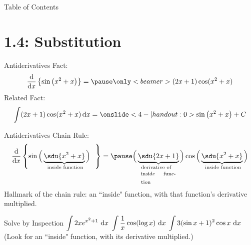 

 \begin{frame}{Table of Contents }
\mapofcontentsA{\ad,\atech}
 \end{frame}
\section{1.4: Substitution}
\begin{frame}{Antiderivatives}
Fact:
\[\diff{}{x}\left\{\sin\left(x^2+x \right) \right\}=\pause \only<beamer>{(2x+1)\cos(x^2+x)}\]\pause\vfill
Related Fact:
\[\int(2x+1)\cos(x^2+x)\,\dee x =\onslide<4-|handout:0>{ \sin\left(x^2+x \right)+C} \]\vfill
{}
\end{frame}
\begin{frame}{Antiderivatives}
Chain Rule:
\[\diff{}{x}
\left\{\sin\Big(\underbrace{\sdu{x^2+x}}_{\mathclap{\text{ inside function}}}\Big) ~~ \right\}=\pause\Big(\underbrace{\sdu{2x+1}}_{\mathclap{\text{\parbox{1.75cm}{derivative of \\[-1mm]inside function}}}}\Big)\cos\Big(\underbrace{\sdu{x^2+x}}_{\text{\makebox[0pt]{ inside function}}}\Big)
\]\pause\vfill
Hallmark of the chain rule: an ``inside" function, with that function's derivative multiplied.\\ 
\end{frame}
\begin{frame}{Solve by Inspection}
$\displaystyle \int 2xe^{x^2+1}\ \text{d} x$ \vfill
$\displaystyle\int \frac1x \cos(\log x)\ \text{d} x $ \vfill
$\displaystyle\int 3(\sin x+1)^2 \cos x\ \text{d} x $  \vfill
(Look for an ``inside" function, with its derivative multiplied.)
\end{frame}

